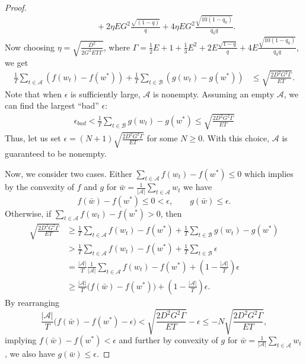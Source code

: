 \documentclass{article} %
\def\A{{\mathcal A}}
\def\B{{\mathcal B}}
\begin{document}
\begin{proof}
\begin{equation*}
\begin{aligned}
        &\qquad + 2\eta E G^2\frac{\sqrt{(1-q)}}{q} + 4 \eta E G^2 \frac{\sqrt{10(1-q_0)}}{q_0q}.
    \end{aligned}
\end{equation*}
Now choosing $\eta = \sqrt{\frac{D^2}{2G^2 E T \Gamma}}$, where $\Gamma = \frac{1}{2} E + 1 + \frac{1}{3} E^2 + 2E\frac{\sqrt{1-q}}{q} + 4E\frac{\sqrt{10(1-q_0)}}{q_0q}$, we get
\begin{equation*}
    \begin{aligned}
        \frac{1}{T}\sum_{t\in \A}(f(w_t) - f(w^*) ) + \frac{1}{T}\sum_{t\in \B}(g(w_t) - g(w^*)) &\leq \sqrt{\frac{{2 D^2 G^2 \Gamma}}{{E T}}}.
    \end{aligned}
\end{equation*}
Note that when $\epsilon$ is sufficiently large, $\A$ is nonempty. Assuming an empty $\A$, we can find the largest ``bad'' $\epsilon$:
\begin{align}
    \nonumber
    \epsilon_{bad} < \frac{1}{T} \sum_{t\in \B}g(w_t) - g(w^*) \leq \sqrt{\frac{{2 D^2 G^2 \Gamma}}{{E T}}}
\end{align}
Thus, let us set $\epsilon = (N+1) \sqrt{\frac{{2 D^2 G^2 \Gamma}}{{E T}}} $ for some $N\geq 0$. With this choice, $\A$ is guaranteed to be nonempty.

Now, we consider two cases. Either $\sum_{t\in \A} f(w_t)-f(w^*) \leq 0$ which implies by the convexity of $f$ and $g$ for $\bar{w} = \frac{1}{|\A|} \sum_{t\in \A} w_t$ we have
\begin{equation}
    \label{eq:fedsgbicm_result1}
  f(\bar{w})-f(w^*) \leq 0 <\epsilon,\qquad  g(\bar{w})\leq \epsilon.
\end{equation}
Otherwise, if $\sum_{t\in \A} f(w_t)-f(w^*) >0$, then
    \begin{equation}\label{eq:fedsgbicm_cvx_che}
        \begin{aligned}
          \sqrt{\frac{{2 D^2 G^2 \Gamma}}{{E T}}}  &\geq \frac{1}{T} \sum_{t\in \A} f(w_t)-f(w^*) +\frac{1}{T} \sum_{t\in \B} g(w_t)-g(w^*)\\&>\frac{1}{T} \sum_{t\in \A} f(w_t)-f(w^*) +\frac{1}{T} \sum_{t\in \B} \epsilon\\&=\frac{|\A|}{T}  \frac{1}{|\A|}\sum_{t\in \A} f(w_t)-f(w^*) +(1-\frac{|\A|}{T}) \epsilon\\&\geq\frac{|\A|}{T} \big( f(\bar{w})-f(w^*) \big)+(1-\frac{|\A|}{T}) \epsilon .
        \end{aligned}
    \end{equation}
    By rearranging
\begin{equation}
  \frac{|\A|}{T}  \Big(f(\bar{w})-f(w^*)-\epsilon\Big)  <\sqrt{\frac{{2 D^2 G^2 \Gamma}}{{E T}}} -\epsilon \leq -N\sqrt{\frac{{2 D^2 G^2 \Gamma}}{{E T}}},
\end{equation}
implying $f(\bar{w})-f(w^*)<\epsilon$ and further by convexity of $g$ for $\bar{w} = \frac{1}{|\A|} \sum_{t\in \A} w_t$, we also have $g(\bar{w})\leq\epsilon$. 
\end{proof}
\end{document}
